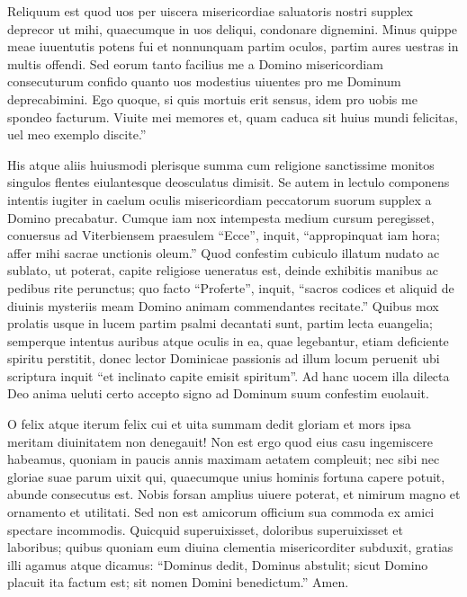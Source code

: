 \documentclass[a5paper,twoside]{article}
\begin{document}
Reliquum est quod uos per uiscera misericordiae saluatoris nostri supplex deprecor ut mihi, quaecumque in uos deliqui, condonare dignemini.  Minus quippe meae iuuentutis potens fui et nonnunquam partim oculos, partim aures uestras in multis offendi.   Sed eorum tanto facilius me a Domino misericordiam consecuturum confido quanto uos modestius uiuentes pro me Dominum deprecabimini.  Ego quoque, si quis mortuis erit sensus, idem pro uobis me spondeo facturum.  Viuite mei memores et, quam caduca sit huius mundi felicitas, uel meo exemplo discite.''

His atque aliis huiusmodi plerisque summa cum religione sanctissime monitos singulos flentes eiulantesque deosculatus dimisit.  Se autem in lectulo componens intentis iugiter in caelum oculis misericordiam peccatorum suorum supplex a Domino precabatur. Cumque iam nox intempesta medium cursum peregisset, conuersus ad Viterbiensem praesulem ``Ecce'', inquit, ``appropinquat iam hora; affer mihi sacrae unctionis oleum.''  Quod confestim cubiculo illatum nudato ac sublato, ut poterat, capite religiose ueneratus est, deinde exhibitis manibus ac pedibus rite perunctus; quo facto ``Proferte'', inquit, ``sacros codices et aliquid de diuinis mysteriis meam Domino animam commendantes recitate.''  Quibus mox prolatis usque in lucem partim psalmi decantati sunt, partim lecta euangelia; semperque intentus auribus atque oculis in ea, quae legebantur, etiam deficiente spiritu perstitit, donec lector Dominicae passionis ad illum locum peruenit ubi scriptura inquit ``et inclinato capite emisit spiritum''.  Ad hanc uocem illa dilecta Deo anima ueluti certo accepto signo ad Dominum suum confestim euolauit.

O felix atque iterum felix cui et uita summam dedit gloriam et mors ipsa meritam diuinitatem non denegauit!  Non est ergo quod eius casu ingemiscere habeamus, quoniam in paucis annis maximam aetatem compleuit; nec sibi nec gloriae suae parum uixit qui, quaecumque unius hominis fortuna capere potuit, abunde consecutus est.  Nobis forsan amplius uiuere poterat, et nimirum magno et ornamento et utilitati.  Sed non est amicorum officium sua commoda ex amici spectare incommodis.  Quicquid superuixisset, doloribus superuixisset et laboribus; quibus quoniam eum diuina clementia misericorditer subduxit, gratias illi agamus atque dicamus: ``Dominus dedit, Dominus abstulit; sicut Domino placuit ita factum est; sit nomen Domini benedictum.'' Amen.


\endnumbering
\end{document}
